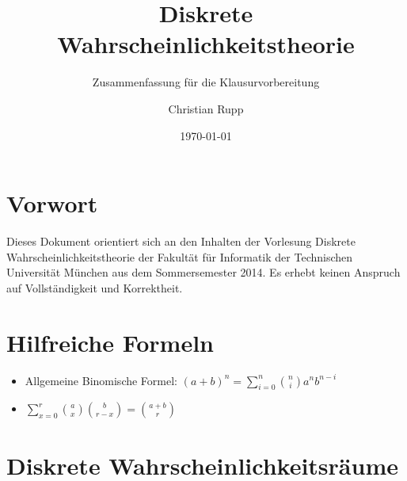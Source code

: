 \documentclass[a4,12pt]{scrartcl}
\title{Diskrete Wahrscheinlichkeitstheorie}
\subtitle{Zusammenfassung für die Klausurvorbereitung}
\author{Christian Rupp}
\date{\today}
\begin{document}
\maketitle

\newpage

\tableofcontents

\section{Vorwort}

Dieses Dokument orientiert sich an den Inhalten der Vorlesung Diskrete Wahrscheinlichkeitstheorie der Fakultät für Informatik der Technischen Universität München aus dem Sommersemester 2014.
Es erhebt keinen Anspruch auf Vollständigkeit und Korrektheit.

\section{Hilfreiche Formeln}

\begin{itemize}
\item Allgemeine Binomische Formel: $(a+b)^n=\sum^n_{i=0}\binom {n}{i}a^nb^{n-i}$
\item $\sum^r_{x=0}\binom{a}{x}\binom{b}{r-x}=\binom{a+b}{r}$
\end{itemize}

\section{Diskrete Wahrscheinlichkeitsräume}
\end{document}
